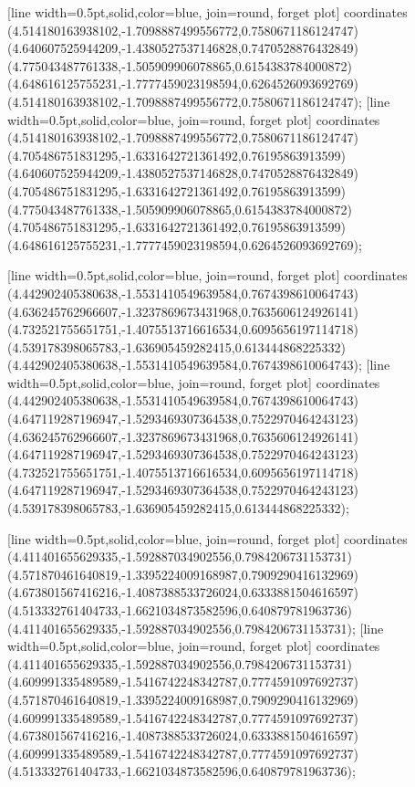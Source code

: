 [line width=0.5pt,solid,color=blue, join=round, forget plot] coordinates {(4.514180163938102,-1.7098887499556772,0.7580671186124747) (4.640607525944209,-1.4380527537146828,0.7470528876432849) (4.775043487761338,-1.505909906078865,0.6154383784000872) (4.648616125755231,-1.7777459023198594,0.6264526093692769) (4.514180163938102,-1.7098887499556772,0.7580671186124747)};
[line width=0.5pt,solid,color=blue, join=round, forget plot] coordinates {(4.514180163938102,-1.7098887499556772,0.7580671186124747) (4.705486751831295,-1.6331642721361492,0.76195863913599) (4.640607525944209,-1.4380527537146828,0.7470528876432849) (4.705486751831295,-1.6331642721361492,0.76195863913599) (4.775043487761338,-1.505909906078865,0.6154383784000872) (4.705486751831295,-1.6331642721361492,0.76195863913599) (4.648616125755231,-1.7777459023198594,0.6264526093692769)};

[line width=0.5pt,solid,color=blue, join=round, forget plot] coordinates {(4.442902405380638,-1.5531410549639584,0.7674398610064743) (4.636245762966607,-1.3237869673431968,0.7635606124926141) (4.732521755651751,-1.4075513716616534,0.6095656197114718) (4.539178398065783,-1.636905459282415,0.613444868225332) (4.442902405380638,-1.5531410549639584,0.7674398610064743)};
[line width=0.5pt,solid,color=blue, join=round, forget plot] coordinates {(4.442902405380638,-1.5531410549639584,0.7674398610064743) (4.647119287196947,-1.5293469307364538,0.7522970464243123) (4.636245762966607,-1.3237869673431968,0.7635606124926141) (4.647119287196947,-1.5293469307364538,0.7522970464243123) (4.732521755651751,-1.4075513716616534,0.6095656197114718) (4.647119287196947,-1.5293469307364538,0.7522970464243123) (4.539178398065783,-1.636905459282415,0.613444868225332)};

[line width=0.5pt,solid,color=blue, join=round, forget plot] coordinates {(4.411401655629335,-1.592887034902556,0.7984206731153731) (4.571870461640819,-1.3395224009168987,0.7909290416132969) (4.673801567416216,-1.4087388533726024,0.6333881504616597) (4.513332761404733,-1.6621034873582596,0.640879781963736) (4.411401655629335,-1.592887034902556,0.7984206731153731)};
[line width=0.5pt,solid,color=blue, join=round, forget plot] coordinates {(4.411401655629335,-1.592887034902556,0.7984206731153731) (4.609991335489589,-1.5416742248342787,0.7774591097692737) (4.571870461640819,-1.3395224009168987,0.7909290416132969) (4.609991335489589,-1.5416742248342787,0.7774591097692737) (4.673801567416216,-1.4087388533726024,0.6333881504616597) (4.609991335489589,-1.5416742248342787,0.7774591097692737) (4.513332761404733,-1.6621034873582596,0.640879781963736)};


